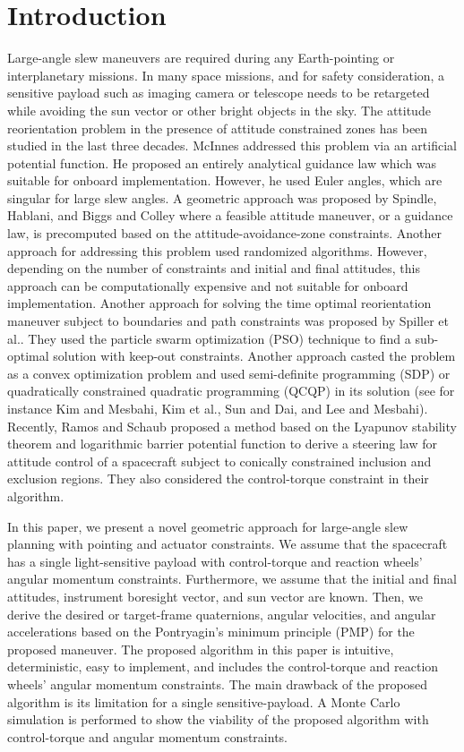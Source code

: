 \documentclass[letterpaper, paper,12pt]{AAS}		%
\begin{document}
	\section{Introduction}
	Large-angle slew maneuvers are required during any Earth-pointing or interplanetary missions. In many space missions, and for safety consideration, a sensitive payload such as imaging camera or telescope needs to be retargeted while avoiding the sun vector or other bright objects in the sky.
	The attitude reorientation problem in the presence of attitude constrained zones has been studied in the last three decades. McInnes\cite{McInnes1994} addressed this problem via an artificial potential function. He proposed an entirely analytical guidance law which was suitable for onboard implementation. However, he used Euler angles, which are singular for large slew angles. 
	A geometric approach was proposed by Spindle\cite{Spindler1998}, Hablani\cite{Hablani1998}, and Biggs and Colley\cite{Biggs2016}  where a feasible attitude maneuver, or a guidance law, is precomputed based on the attitude-avoidance-zone constraints.  Another approach for addressing this problem used randomized algorithms\cite{Frazzoli01}. However, depending on the number of constraints and initial and final attitudes, this approach can be computationally expensive and not suitable for onboard implementation. Another approach for solving the time optimal reorientation maneuver subject to boundaries and path constraints was proposed by Spiller et al.\cite{Spiller2016}. They used the particle swarm optimization (PSO) technique to find a sub-optimal solution with keep-out constraints. Another approach casted the problem as a convex optimization problem and used semi-definite programming (SDP) or quadratically constrained quadratic programming (QCQP) in its solution (see for instance Kim and Mesbahi\cite{Kim2004}, Kim et al.\cite{Kim2010}, Sun and Dai\cite{Sun2015}, and Lee and Mesbahi\cite{Lee2014}). Recently, Ramos and Schaub\cite{Ramos2018} proposed a method based on the Lyapunov stability theorem and logarithmic barrier potential function to derive a steering law for attitude control of a spacecraft subject to conically constrained inclusion and exclusion regions. They also considered the control-torque constraint in their algorithm.  
	
In this paper, we present a novel geometric approach for large-angle slew planning with pointing and actuator constraints.  We assume that the spacecraft has a single light-sensitive payload with control-torque and reaction wheels' angular momentum constraints. Furthermore, we assume that the initial and final attitudes, instrument boresight vector, and sun vector are known. Then, we derive the desired or target-frame quaternions, angular velocities, and angular accelerations based on the Pontryagin's minimum principle (PMP) for the proposed maneuver. The proposed algorithm in this paper is intuitive, deterministic, easy to implement, and includes the control-torque and reaction wheels' angular momentum constraints. The main drawback of the proposed algorithm is its limitation for a single sensitive-payload.  A Monte Carlo simulation is performed to show the viability of the proposed algorithm with control-torque and angular momentum constraints. 
	
\end{document}
